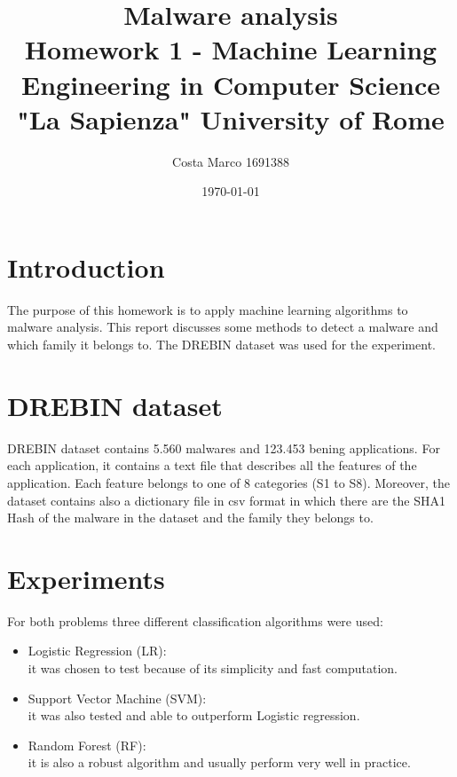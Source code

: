 \documentclass[11pt]{article}
\title{\textbf{Malware analysis} \\ \bigskip \large Homework 1 - Machine Learning \\ Engineering in Computer Science \\ "La Sapienza" University of Rome}
\author{Costa Marco 1691388}
\date{\today}
\begin{document}
\maketitle
\pagebreak
\tableofcontents
\pagebreak

\section{Introduction}
The purpose of this homework is to apply machine learning algorithms to malware analysis. This report
discusses some methods to detect a malware and which family it belongs to. The DREBIN dataset was used for the experiment.

\section{DREBIN dataset}
DREBIN dataset contains 5.560 malwares and 123.453 bening applications.
For each application, it contains a text file that describes all the
features of the application. Each feature belongs to one of 8 categories (S1 to S8).
Moreover, the dataset contains also a dictionary file in csv format in which there are the SHA1 Hash of the malware in the dataset and the family they belongs to.

\section{Experiments}
For both problems three different classification algorithms were used:
\begin{itemize}
	\item Logistic Regression (LR): \\ it was chosen to test because of its simplicity and
fast computation. 
	\item Support Vector Machine (SVM): \\ it was also tested and able to outperform Logistic regression.
	\item Random Forest (RF): \\ it is also a robust algorithm and usually perform very well in
	practice.
\end{itemize}

\pagebreak
\end{document}
